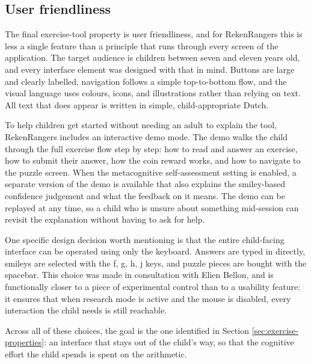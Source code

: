 \subsection{User friendliness}
The final exercise-tool property is user friendliness, and for RekenRangers this is less a single feature than a principle that runs through every screen of the application. The target audience is children between seven and eleven years old, and every interface element was designed with that in mind. Buttons are large and clearly labelled, navigation follows a simple top-to-bottom flow, and the visual language uses colours, icons, and illustrations rather than relying on text. All text that does appear is written in simple, child-appropriate Dutch.

To help children get started without needing an adult to explain the tool, RekenRangers includes an interactive demo mode. The demo walks the child through the full exercise flow step by step: how to read and answer an exercise, how to submit their answer, how the coin reward works, and how to navigate to the puzzle screen. When the metacognitive self-assessment setting is enabled, a separate version of the demo is available that also explains the smiley-based confidence judgement and what the feedback on it means. The demo can be replayed at any time, so a child who is unsure about something mid-session can revisit the explanation without having to ask for help.

One specific design decision worth mentioning is that the entire child-facing interface can be operated using only the keyboard. Answers are typed in directly, smileys are selected with the f, g, h, j keys, and puzzle pieces are bought with the spacebar. This choice was made in consultation with Elien Bellon, and is functionally closer to a piece of experimental control than to a usability feature: it ensures that when research mode is active and the mouse is disabled, every interaction the child needs is still reachable.

Across all of these choices, the goal is the one identified in Section \ref{sec:exercise-properties}: an interface that stays out of the child's way, so that the cognitive effort the child spends is spent on the arithmetic.